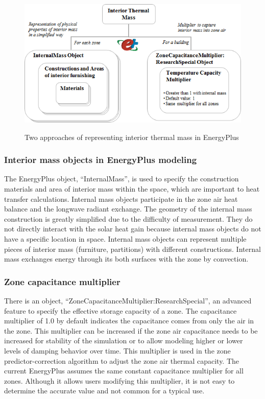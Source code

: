 \begin{figure}[h]
\begin{center}
\includegraphics[width=428pt]{media/img_HybridModel-2.png}
\caption{Two approaches of representing interior thermal mass in EnergyPlus}\protect \label{fig:two-approaches-of-representing-interior-thermal-mass-in-EnergyPlus}
\end{center}
\end{figure}

\subsubsection{Interior mass objects in EnergyPlus modeling}\label{interior-mass-objects-in-EnergyPlus-modeling}

The EnergyPlus object, ``InternalMass'', is used to specify the construction materials and area of interior mass within the space, which are important to heat transfer calculations. Internal mass objects participate in the zone air heat balance and the longwave radiant exchange. The geometry of the internal mass construction is greatly simplified due to the difficulty of measurement. They do not directly interact with the solar heat gain because internal mass objects do not have a specific location in space. Internal mass objects can represent multiple pieces of interior mass (furniture, partitions) with different constructions. Internal mass exchanges energy through its both surfaces with the zone by convection. 

\subsubsection{Zone capacitance multiplier}\label{zone-capacitance-multiplier}

There is an object, ``ZoneCapacitanceMultiplier:ResearchSpecial'', an advanced feature to specify the effective storage capacity of a zone. The capacitance multiplier of 1.0 by default indicates the capacitance comes from only the air in the zone. This multiplier can be increased if the zone air capacitance needs to be increased for stability of the simulation or to allow modeling higher or lower levels of damping behavior over time. This multiplier is used in the zone predictor-correction algorithm to adjust the zone air thermal capacity. The current EnergyPlus assumes the same constant capacitance multiplier for all zones. Although it allows users modifying this multiplier, it is not easy to determine the accurate value and not common for a typical use.


